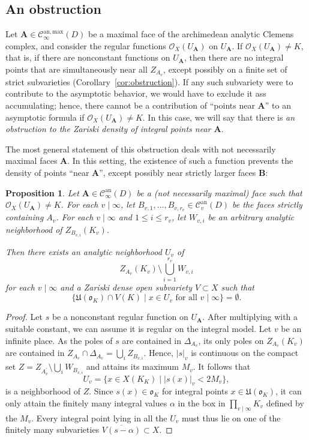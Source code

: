 \documentclass[a4paper, twoside, 10pt]{amsart}
\newcommand{\uA}{{\boldsymbol{A}}}
\newcommand{\uB}{{\boldsymbol{B}}}
\newcommand{\cC}{\mathcal{C}}
\newcommand{\cO}{\mathcal{O}}
\newcommand{\mU}{\mathfrak{U}}
\newcommand{\fo}{\mathfrak{o}}
\newcommand{\Can}{\cC^{\mathrm{an}}}
\newcommand{\Canmax}{\cC^{\mathrm{an,max}}}
\newcommand{\abs}[1]{\left\lvert#1\right\rvert}
\newtheorem{proposition}[theorem]{Proposition}
\theoremstyle{definition}
\begin{document}
\subsection{An obstruction}\label{ssec:obstruction}

Let $\uA\in\Canmax_\infty(D)$ be a maximal face of the archimedean analytic Clemens complex, and consider the regular functions $\cO_X(U_\uA)$ on $U_\uA$.
If $\cO_X(U_\uA)\ne K$, that is, if there are nonconstant functions on $U_\uA$, then there are no integral points that are simultaneously near all $Z_{A_v}$, except possibly on a finite set of strict subvarieties (Corollary~\ref{cor:obstruction}). If any such subvariety were to contribute to the asymptotic behavior, we would have to exclude it ass accumulating; hence, there cannot be a contribution of ``points near $\uA$'' to an asymptotic formula if $\cO_X(U_\uA)\ne K$. In this case, we will say that there is \emph{an obstruction to the Zariski density of integral points near $\uA$}.

The most general statement of this obstruction deals with not necessarily maximal faces $\uA$. In this setting, the existence of such a function prevents the density of points ``near $\uA$'', except possibly near strictly larger faces $\uB$: 

\begin{proposition}\label{prop:general-obstruction}
  Let $\uA\in\Can_\infty(D)$ be a (not necessarily maximal) face such that $\cO_X(U_\uA)\ne K$.
  For each $v\mid\infty$, let $B_{v,1},\dots,B_{v,r_v}\in \Can_v(D)$ be the faces strictly containing $A_v$.
  For each $v\mid\infty$ and $1\le i\le r_v$, let $W_{v,i}$ be an arbitrary analytic neighborhood of $Z_{B_{v,i}}(K_v)$. 

  Then there exists an analytic neighborhood $U_v$ of 
  \[
    Z_{A_v}(K_v) \setminus \bigcup_{i=1}^{r_v} W_{v,i}
  \]
  for each $v\mid\infty$ and a Zariski dense open subvariety $V\subset X$ such that
  \[
    \{ \mU(\fo_K) \cap V(K) \mid x \in U_v \text{ for all } v\mid\infty\} = \emptyset.
  \]
\end{proposition}
\begin{proof}
  Let $s$ be a nonconstant regular function on $U_\uA$. After multiplying with a suitable constant, we can assume it is regular on the integral model. Let $v$ be an infinite place. 
  As the poles of $s$ are contained in $\Delta_{A_v}$, its only poles on $Z_{A_v}(K_v)$ are contained in $Z_{A_v} \cap \Delta_{A_v} = \bigcup_i Z_{B_{v,i}}$.  Hence, $\abs{s}_v$ is continuous on the compact set $Z = Z_{A_v^\prime}\setminus\bigcup_i W_{B_{v,i}}$ and attains its maximum $M_v$.
  It follows that
  \[
    U_v=\{x\in X(K_K)\mid \abs{s(x)}_v < 2 M_v\},
  \]
  is a neighborhood of $Z$.
  Since $s(x)\in\fo_K$ for integral points $x\in\mU(\fo_K)$, it can only attain the finitely many integral values $\alpha$ in the box in $\prod_{v\mid\infty} K_v$ defined by the $M_v$. Every integral point lying in all the $U_v$ must thus lie on one of the finitely many subvarieties $\overline{V(s-\alpha)}\subset X$.
\end{proof}
\end{document}
